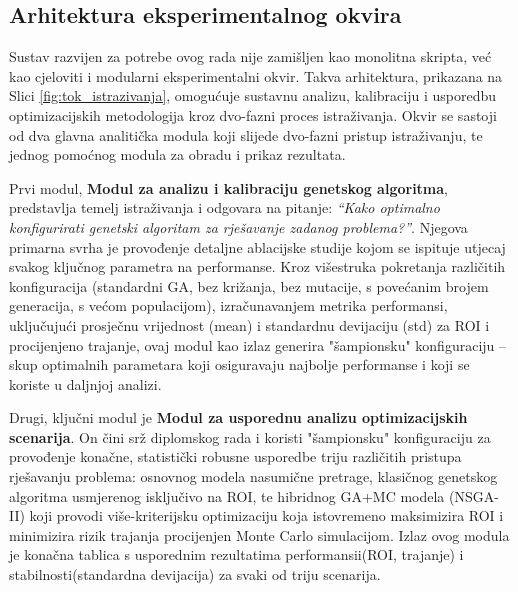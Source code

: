 \subsection{Arhitektura eksperimentalnog okvira}

Sustav razvijen za potrebe ovog rada nije zamišljen kao monolitna skripta, već kao cjeloviti i modularni eksperimentalni okvir. Takva arhitektura, prikazana na Slici \ref{fig:tok_istrazivanja}, omogućuje sustavnu analizu, kalibraciju i usporedbu optimizacijskih metodologija kroz dvo-fazni proces istraživanja. Okvir se sastoji od dva glavna analitička modula koji slijede dvo-fazni pristup istraživanju, te jednog pomoćnog modula za obradu i prikaz rezultata.

Prvi modul, \textbf{Modul za analizu i kalibraciju genetskog algoritma}, predstavlja temelj istraživanja i odgovara na pitanje: \emph{``Kako optimalno konfigurirati genetski algoritam za rješavanje zadanog problema?''}. Njegova primarna svrha je provođenje detaljne ablacijske studije kojom se ispituje utjecaj svakog ključnog parametra na performanse. Kroz višestruka pokretanja različitih konfiguracija (standardni GA, bez križanja, bez mutacije, s povećanim brojem generacija, s većom populacijom), izračunavanjem metrika performansi, uključujući prosječnu vrijednost (mean) i standardnu devijaciju (std) za ROI i procijenjeno trajanje, ovaj modul kao izlaz generira "šampionsku" konfiguraciju – skup optimalnih parametara koji osiguravaju najbolje performanse i koji se koriste u daljnjoj analizi.

    Drugi, ključni modul je \textbf{Modul za usporednu analizu optimizacijskih scenarija}. On čini srž diplomskog rada i koristi "šampionsku" konfiguraciju za provođenje konačne, statistički robusne usporedbe triju različitih pristupa rješavanju problema: osnovnog modela nasumične pretrage, klasičnog genetskog algoritma usmjerenog isključivo na ROI, te hibridnog GA+MC modela (NSGA-II) koji provodi više-kriterijsku optimizaciju koja istovremeno maksimizira ROI i minimizira rizik trajanja procijenjen Monte Carlo simulacijom.  Izlaz ovog modula je konačna tablica s usporednim rezultatima performansii(ROI, trajanje) i stabilnosti(standardna devijacija) za svaki od triju scenarija.

